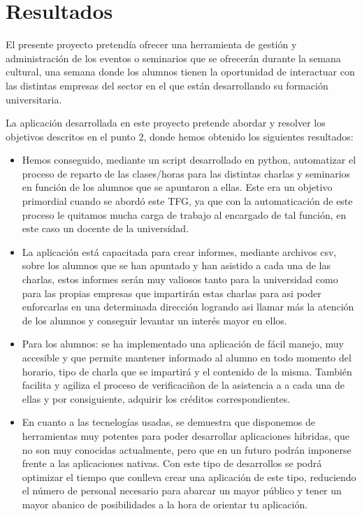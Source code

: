 \documentclass[a4paper, 12pt]{book}
\begin{document}
\cleardoublepage
\chapter{Resultados}

El presente proyecto pretendía ofrecer una herramienta de gestión y administración de los eventos o seminarios que se ofrecerán durante la semana cultural, una semana donde los alumnos tienen la oportunidad de interactuar con las distintas empresas del sector en el que están desarrollando su formación universitaria.

La aplicación desarrollada en este proyecto pretende abordar y resolver los objetivos descritos en el punto 2, donde hemos obtenido los siguientes resultados:

\begin{itemize}
  \item Hemos conseguido, mediante un script desarrollado en python, automatizar el proceso de reparto de las clases/horas para las distintas charlas y seminarios en función de los alumnos que se apuntaron a ellas. Este era un objetivo primordial cuando se abordó este TFG, ya que con la automaticación de este proceso le quitamos mucha carga de trabajo al encargado de tal función, en este caso un docente de la universidad.
  
  \item La aplicación está capacitada para crear informes, mediante archivos csv, sobre los alumnos que se han apuntado y han asistido a cada una de las charlas, estos informes serán muy valiosos tanto para la universidad como para las propias empresas que impartirán estas charlas para asi poder enforcarlas en una determinada dirección logrando asi llamar más la atención de los alumnos y conseguir levantar un interés mayor en ellos.
   
   \item Para los alumnos: se ha implementado una aplicación de fácil manejo, muy accesible y que permite mantener informado al alumno en todo momento del horario, tipo de charla que se impartirá y el contenido de la misma. También facilita y agiliza el proceso de verificaciñon de la asistencia a a cada una de ellas y por consiguiente, adquirir los créditos correspondientes.
   
   \item En cuanto a las tecnelogías usadas, se demuestra que disponemos de herramientas muy potentes para poder desarrollar aplicaciones hibridas, que no son muy conocidas actualmente, pero que en un futuro podrán imponerse frente a las aplicaciones nativas. Con este tipo de desarrollos se podrá optimizar el tiempo que conlleva crear una aplicación de este tipo, reduciendo el número de personal necesario para abarcar un mayor público y tener un mayor abanico de posibilidades a la hora de orientar tu aplicación.
\end{itemize}
\end{document}
